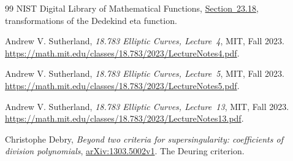 \documentclass[11pt,a4paper]{article}
\theoremstyle{remark}
\begin{document}
\begin{thebibliography}{99}
NIST Digital Library of Mathematical Functions,
\href{https://dlmf.nist.gov/23.18}{Section~23.18},
transformations of the Dedekind eta function.

Andrew V. Sutherland,
\emph{18.783 Elliptic Curves, Lecture~4}, MIT, Fall 2023.
\url{https://math.mit.edu/classes/18.783/2023/LectureNotes4.pdf}.

Andrew V. Sutherland,
\emph{18.783 Elliptic Curves, Lecture~5}, MIT, Fall 2023.
\url{https://math.mit.edu/classes/18.783/2023/LectureNotes5.pdf}.

Andrew V. Sutherland,
\emph{18.783 Elliptic Curves, Lecture~13}, MIT, Fall 2023.
\url{https://math.mit.edu/classes/18.783/2023/LectureNotes13.pdf}.

Christophe Debry,
\emph{Beyond two criteria for supersingularity: coefficients of division polynomials},
\href{https://arxiv.org/abs/1303.5002v1}{arXiv:1303.5002v1}.
The Deuring criterion.
\end{thebibliography}
\end{document}
